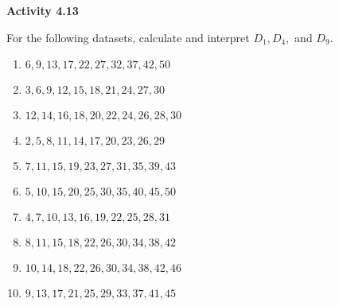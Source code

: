 \vspace{0.3ex}
\noindent\textbf{Activity 4.13}

\vspace{0.2ex}

For the following datasets, calculate and interpret \(D_1, D_4,\) and \(D_9\).

\begin{enumerate}
    \item \(6, 9, 13, 17, 22, 27, 32, 37, 42, 50\)  
    \item \(3, 6, 9, 12, 15, 18, 21, 24, 27, 30\)  
    \item \(12, 14, 16, 18, 20, 22, 24, 26, 28, 30\)  
    \item \(2, 5, 8, 11, 14, 17, 20, 23, 26, 29\)  
    \item \(7, 11, 15, 19, 23, 27, 31, 35, 39, 43\)  
    \item \(5, 10, 15, 20, 25, 30, 35, 40, 45, 50\)  
    \item \(4, 7, 10, 13, 16, 19, 22, 25, 28, 31\)  
    \item \(8, 11, 15, 18, 22, 26, 30, 34, 38, 42\)  
    \item \(10, 14, 18, 22, 26, 30, 34, 38, 42, 46\)  
    \item \(9, 13, 17, 21, 25, 29, 33, 37, 41, 45\)  
\end{enumerate}
